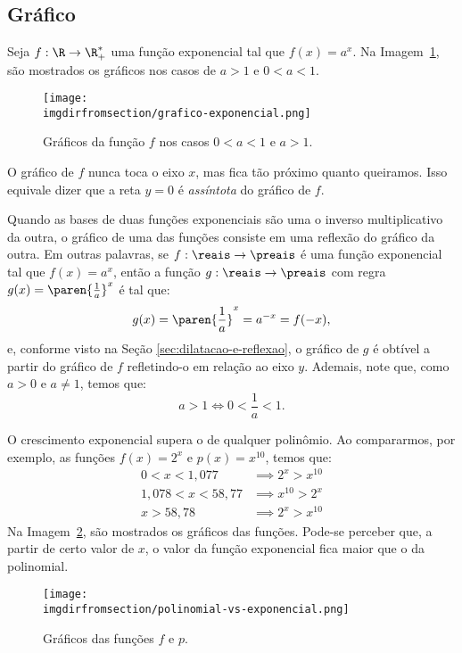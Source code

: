 \subsection{Gráfico}

\begin{example}
	Seja $f: \R \to \R_+^*$ uma função exponencial tal que $f(x) = a^x$. Na Imagem~\ref{img:graficos-exponencial}, são mostrados os gráficos nos casos de $a > 1$ e $0 < a < 1$.
	\begin{figure}[H]
		\centering
		\texttt{[image: \\imgdirfromsection/grafico-exponencial.png]}
		\caption{Gráficos da função $f$ nos casos $0<a<1$ e $a>1$.}
		\label{img:graficos-exponencial}
	\end{figure}
	O gráfico de $f$ nunca toca o eixo $x$, mas fica tão próximo quanto queiramos. Isso equivale dizer que a reta $y=0$ é \emph{assíntota} do gráfico de $f$.
\end{example}

\begin{remark}
	Quando as bases de duas funções exponenciais são uma o inverso multiplicativo da outra, o gráfico de uma das funções consiste em uma reflexão do gráfico da outra. Em outras palavras, se $f:\reais \to \preais$ é uma função exponencial tal que $f(x) = a^x $, então a função $g:\reais \to \preais$ com regra $g(x) = \paren{\frac 1 a}^x$ é tal que:
	\[
		g(x) = \paren{\frac 1 a}^x = a^{-x} = f(-x),    
	\]
	e, conforme visto na Seção \ref{sec:dilatacao-e-reflexao}, o gráfico de $g$ é obtível a partir do gráfico de $f$ refletindo-o em relação ao eixo $y$. Ademais, note que, como $a > 0$ e $a \ne 1$, temos que:
	\[
		a > 1 \iff 0 < \frac{1}{a} < 1.
	\]
\end{remark}

\begin{example}
	O crescimento exponencial supera o de qualquer polinômio. Ao compararmos, por exemplo, as funções $f(x) = 2^x$ e $p(x)=x^{10}$, temos que:
	\begin{align*}
		0<x<1{,}077 & \implies  2^x > x^{10} \\
		1{,}078 < x < 58{,}77 & \implies  x^{10} > 2^x \\
		x>58{,}78 & \implies  2^x > x^{10}
	\end{align*}
	Na Imagem~\ref{img:polinomial-vs-exponencial}, são mostrados os gráficos das funções. Pode-se perceber que, a partir de certo valor de $x$, o valor da função exponencial fica maior que o da polinomial. 
	\begin{figure}[H]
		\centering
		\texttt{[image: \\imgdirfromsection/polinomial-vs-exponencial.png]}
		\caption{Gráficos das funções $f$ e $p$.}
		\label{img:polinomial-vs-exponencial}
	\end{figure}
\end{example}

